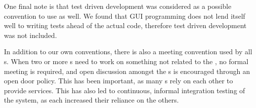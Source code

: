 One final note is that test driven development was considered as a possible convention to use as well. 
We found that GUI programming does not lend itself well to writing tests ahead of the actual code, therefore test driven development was not included. 

In addition to our own conventions, there is also a meeting convention used by all \localgroup[]s.
When two or more \localgroup{}s need to work on something not related to the \globalgroup{}, no formal meeting is required, and open discussion amongst the \localgroup{}s is encouraged through an open door policy. 
This has been important, as many \localgroup{}s rely on each other to provide services. 
This has also led to continuous, informal integration testing of the system, as each \localgroup{} increased their reliance on the others. 